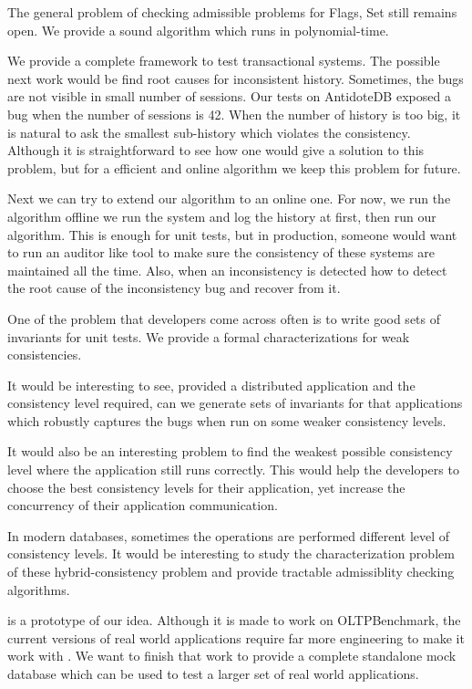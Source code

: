 The general problem of checking admissible problems for Flags, Set still remains open. We provide a sound algorithm which runs in polynomial-time.

We provide a complete framework to test transactional systems. The possible next work would be find root causes for inconsistent history. Sometimes, the bugs are not visible in small number of sessions. Our tests on AntidoteDB exposed a bug when the number of sessions is 42. When the number of history is too big, it is natural to ask the smallest sub-history which violates the consistency. Although it is straightforward to see how one would give a solution to this problem, but for a efficient and online algorithm we keep this problem for future.

Next we can try to extend our algorithm to an online one. For now, we run the algorithm offline \ie we run the system and log the history at first, then run our algorithm. This is enough for unit tests, but in production, someone would want to run an auditor like tool to make sure the consistency of these systems are maintained all the time. Also, when an inconsistency is detected how to detect the root cause of the inconsistency bug and recover from it. 

One of the problem that developers come across often is to write good sets of invariants for unit tests. We provide a formal characterizations for weak consistencies.

It would be interesting to see, provided a distributed application and the consistency level required, can we generate sets of invariants for that applications which robustly captures the bugs when run on some weaker consistency levels.

It would also be an interesting problem to find the weakest possible consistency level where the application still runs correctly. This would help the developers to choose the best consistency levels for their application, yet increase the concurrency of their application communication.

In modern databases, sometimes the operations are performed different level of consistency levels. It would be interesting to study the characterization problem of these hybrid-consistency problem and provide tractable admissiblity checking algorithms.

\tool{} is a prototype of our idea. Although it is made to work on OLTPBenchmark, the current versions of real world applications require far more engineering to make it work with \tool{}. We want to finish that work to provide a complete standalone mock database which can be used to test a larger set of real world applications. 